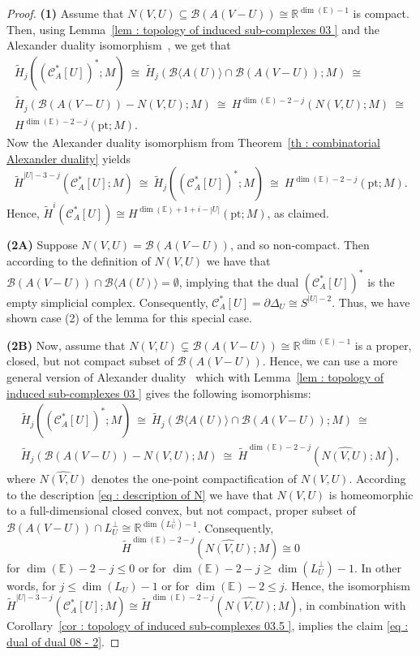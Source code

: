 \documentclass[a4paper,11pt,reqno, english]{amsart}
\theoremstyle{definition}
\theoremstyle{remark}
\newcommand\R{\mathbb R}
\newcommand\CC{\mathscr C}
\newcommand\E{\mathbb{E}}
\newcommand\pt{\mathrm{pt}}
\begin{document}
\begin{proof}
	\medskip
	{\bf (1)}
	Assume that $N(V,U)\subseteq \mathscr{B}(A(V-U)) \cong   \R^{\dim(\E)-1}$ is compact.
	Then, using Lemma~\ref{lem : topology of induced sub-complexes 03 } and the Alexander duality isomorphism~\cite[Cor.\,VI.8.6]{Bredon2010}, we get that
	\begin{multline*}
		\widetilde{H}_j ((\CC_A^*[U])^*;M)  \ \cong \
		\widetilde{H}_j( \mathscr{B}\langle A(U)\rangle\cap \mathscr{B}(A(V-U));M) \ \cong  \ \\
		\widetilde{H}_j( \mathscr{B}(A(V-U))-N(V,U);M)   \  \cong \ H^{\dim(\E)-2-j}(N(V,U);M)\  \cong   \\ H^{\dim(\E)-2-j}(\pt;M)	.
	\end{multline*}
	Now the Alexander duality isomorphism from Theorem~\ref{th : combinatorial Alexander duality} yields
	\[
		\widetilde{H}^{|U|-3-j}	(\CC_A^*[U];M)\ \cong \ \widetilde{H}_j ((\CC_A^*[U])^*;M) \ \cong \  H^{\dim(\E)-2-j}(\pt;M).
	\]
	Hence,
	$
		\widetilde{H}^{i}	(\CC_A^*[U])\cong   H^{\dim(\E)+1+i-|U|}(\pt;M)
	$,
	as claimed.

	\medskip
	{\bf (2A)}
	Suppose $N(V,U)=\mathscr{B}(A(V-U))$, and so non-compact.
	Then according to the definition of $N(V,U)$ we have that $\mathscr{B}(A(V-U))\cap\mathscr{B}\langle A(U)\rangle=\emptyset$, implying that the dual $(\CC_A^*[U])^*$ is the empty simplicial complex.
	Consequently, $\CC_A^*[U]=\partial\Delta_U\cong S^{|U|-2}$.
	Thus, we have shown case (2) of the lemma for this special case.


	\medskip
	{\bf (2B)}
	Now, assume that $N(V,U)\subsetneq \mathscr{B}(A(V-U)) \cong   \R^{\dim(\E)-1}$ is a proper, closed, but
	not compact subset of $\mathscr{B}(A(V-U))$.
	Hence, we can use a more general version of Alexander duality~\cite[(8.18),\,p.\,301]{Dold1995} which with  Lemma~\ref{lem : topology of induced sub-complexes 03 } gives the following isomorphisms:
	\begin{multline*}
		\widetilde{H}_j ((\CC_A^*[U])^*;M)  \ \cong \
		\widetilde{H}_j( \mathscr{B}\langle A(U)\rangle\cap \mathscr{B}(A(V-U));M) \ \cong \\
		\widetilde{H}_j( \mathscr{B}(A(V-U))-N(V,U);M) \ \cong \
		\widetilde{H}^{\dim(\E)-2-j}(\widehat{N(V,U)};M),
	\end{multline*}
	where $\widehat{N(V,U)}$ denotes the one-point compactification of $N(V,U)$.
	According to the description \eqref{eq : description of N} we have that $N(V,U)$  is  homeomorphic to a full-dimensional closed convex, but not compact, proper subset of $ \mathscr{B}(A(V-U)) \cap L_U^{\perp}\cong\R^{\dim (L_U^{\perp})-1}$.
	Consequently,
	\[
		\widetilde{H}^{\dim(\E)-2-j}(\widehat{N(V,U)};M)\cong 0
	\]
	for $\dim(\E)-2-j\leq 0$ or for $\dim(\E)-2-j\geq \dim (L_U^{\perp})-1$.
	In other words, for  $j\leq \dim(L_U)-1$ or for $\dim(\E)-2\leq j$.
	Hence, the isomorphism $\widetilde{H}^{|U|-3-j}	(\CC_A^*[U];M) \cong \widetilde{H}^{\dim(\E)-2-j}(\widehat{N(V,U)};M)$, in combination with Corollary~\ref{cor : topology of induced sub-complexes 03.5 }, implies the claim \eqref{eq : dual of dual 08 - 2}.
\end{proof}
\end{document}
